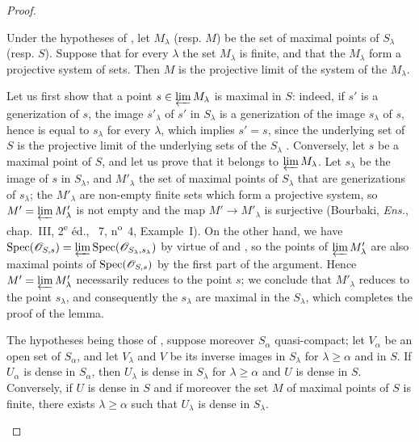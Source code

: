 \begin{proof}
\begin{lemma}[20.3.8.3]
\label{IV.20.3.8.3}
Under the hypotheses of , let $M_\lambda$ (resp. $M$) be the set of maximal points of $S_\lambda$ (resp. $S$).
Suppose that for every $\lambda$ the set $M_\lambda$ is finite, and that the $M_\lambda$ form a projective system of sets.
Then $M$ is the projective limit of the system of the $M_\lambda$.
\end{lemma}

Let us first show that a point $s\in\varprojlim M_\lambda$ is maximal in $S$: indeed, if $s'$ is a generization of $s$, the image $s'_\lambda$ of $s'$ in $S_\lambda$ is a generization of the image $s_\lambda$ of $s$, hence is equal to $s_\lambda$ for every $\lambda$, which implies $s'=s$, since the underlying set of $S$ is the projective limit of the underlying sets of the $S_\lambda$ .
Conversely, let $s$ be a maximal point of $S$, and let us prove that it belongs to $\varprojlim M_\lambda$.
Let $s_\lambda$ be the image of $s$ in $S_\lambda$, and $M'_\lambda$ the set of maximal points of $S_\lambda$ that are generizations of $s_\lambda$; the $M'_\lambda$ are non-empty finite sets which form a projective system, so $M'=\varprojlim M'_\lambda$ is not empty and the map $M'\to M'_\lambda$ is surjective (Bourbaki, \emph{Ens.}, chap.~III, 2\textsuperscript{e} éd., \textsection~7, n\textsuperscript{o}~4, Example~I).
On the other hand, we have $\operatorname{Spec}(\mathscr{O}_{S,s})=\varprojlim\operatorname{Spec}(\mathscr{O}_{S_\lambda,s_\lambda})$ by virtue of  and , so the points of $\varprojlim M'_\lambda$ are also maximal points of $\operatorname{Spec}(\mathscr{O}_{S,s})$ by the first part of the argument.
Hence $M'=\varprojlim M'_\lambda$ necessarily reduces to the point $s$; we conclude that $M'_\lambda$ reduces to the point $s_\lambda$, and consequently the $s_\lambda$ are maximal in the $S_\lambda$, which completes the proof of the lemma.

\begin{lemma}[20.3.8.4]
\label{IV.20.3.8.4}
The hypotheses being those of , suppose moreover $S_\alpha$ quasi-compact; let $V_\alpha$ be an open set of $S_\alpha$, and let $V_\lambda$ and $V$ be its inverse images in $S_\lambda$ for $\lambda\geq\alpha$ and in $S$.
If $U_\alpha$ is dense in $S_\alpha$, then $U_\lambda$ is dense in $S_\lambda$ for $\lambda\geq\alpha$ and $U$ is dense in $S$.
Conversely, if $U$ is dense in $S$ and if moreover the set $M$ of maximal points of $S$ is finite, there exists $\lambda\geq\alpha$ such that $U_\lambda$ is dense in $S_\lambda$.
\end{lemma}


\end{proof}
